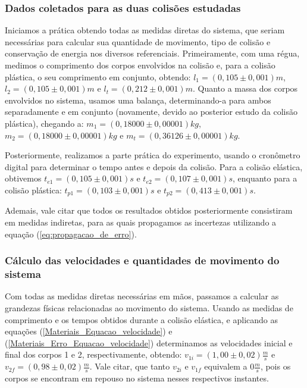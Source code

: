 \documentclass[12pt, twoside]{article}
\begin{document}
\subsubsection{Dados coletados para as duas colisões estudadas}
\label{DadosColetados}

    Iniciamos a prática obtendo todas as medidas diretas do sistema, que seriam necessárias para calcular sua quantidade de movimento, tipo de colisão e conservação de energia nos diversos referenciais. Primeiramente, com uma régua, medimos o comprimento dos corpos envolvidos na colisão e, para a colisão plástica, o seu comprimento em conjunto, obtendo: $l_1 = (0,105 \pm 0,001)m$, $l_2 = (0,105 \pm 0,001)m$ e $l_t = (0,212 \pm 0,001)m$. Quanto a massa dos corpos envolvidos no sistema, usamos uma balança, determinando-a para ambos separadamente e em conjunto (novamente, devido ao posterior estudo da colisão plástica), chegando a: $m_1 = (0,18000 \pm 0,00001)kg$, $m_2 = (0,18000 \pm 0,00001)kg$ e $m_t = (0,36126 \pm 0,00001)kg$.

    Posteriormente, realizamos a parte prática do experimento, usando o cronômetro digital para determinar o tempo  antes e depois da colisão. Para a colisão elástica, obtivemos $t_{e1} = (0,105 \pm 0,001)s$ e $t_{e2} = (0,107 \pm 0,001)s$, enquanto para a colisão plástica: $t_{p1} = (0,103 \pm 0,001)s$ e $t_{p2} = (0,413 \pm 0,001)s$.

    Ademais, vale citar que todos os resultados obtidos posteriormente consistiram em medidas indiretas, para as quais propagamos as incertezas utilizando a equação (\ref{eq:propagacao_de_erro}).

\subsubsection{Cálculo das velocidades e quantidades de movimento do sistema}
\label{velocidadesCalculadas1}

    Com todas as medidas diretas necessárias em mãos, passamos a calcular as grandezas físicas relacionadas ao movimento do sistema. Usando as medidas de comprimento e os tempos obtidos durante a colisão elástica, e aplicando as equações (\ref{Materiais_Equacao_velocidade}) e (\ref{Materiais_Erro_Equacao_velocidade}) determinamos as velocidades inicial e final dos corpos 1 e 2, respectivamente, obtendo: $v_{1i} = (1,00 \pm 0,02)\frac{m}{s}$ e $v_{2f} = ( 0,98 \pm 0,02)\frac{m}{s}$. Vale citar, que tanto $v_{2i}$ e $v_{1f}$ equivalem a $0\frac{m}{s}$, pois os corpos se encontram em repouso no sistema nesses respectivos instantes.
\end{document}
